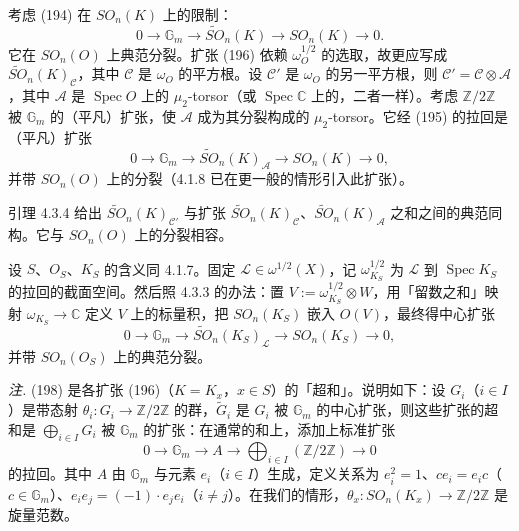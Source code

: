  考虑 (194) 在 $SO_{n}(K)$ 上的限制：
\begin{equation}\tag{196}
0\to\mathbb{G}_{m}\to\tilde{SO}_{n}(K)\to SO_{n}(K)\to 0.
\end{equation}
它在 $SO_{n}(O)$ 上典范分裂。扩张 (196) 依赖 $\omega_{O}^{1/2}$ 的选取，故更应写成 $\tilde{SO}_{n}(K)_{\mathcal{C}}$，其中 $\mathcal{C}$ 是 $\omega_{O}$ 的平方根。设 $\mathcal{C}'$ 是 $\omega_{O}$ 的另一平方根，则 $\mathcal{C}'=\mathcal{C}\otimes\mathcal{A}$，其中 $\mathcal{A}$ 是 $\operatorname{Spec} O$ 上的 $\mu_{2}$-torsor（或 $\operatorname{Spec}\mathbb{C}$ 上的，二者一样）。考虑 $\mathbb{Z}/2\mathbb{Z}$ 被 $\mathbb{G}_{m}$ 的（平凡）扩张，使 $\mathcal{A}$ 成为其分裂构成的 $\mu_{2}$-torsor。它经 (195) 的拉回是（平凡）扩张
\begin{equation}\tag{197}
0\to\mathbb{G}_{m}\to\tilde{SO}_{n}(K)_{\mathcal{A}}\to SO_{n}(K)\to 0,
\end{equation}
并带 $SO_{n}(O)$ 上的分裂（4.1.8 已在更一般的情形引入此扩张）。

引理 4.3.4 给出 $\tilde{SO}_{n}(K)_{\mathcal{C}'}$ 与扩张 $\tilde{SO}_{n}(K)_{\mathcal{C}}$、$\tilde{SO}_{n}(K)_{\mathcal{A}}$ 之和之间的典范同构。它与 $SO_{n}(O)$ 上的分裂相容。

 设 $S$、$O_{S}$、$K_{S}$ 的含义同 4.1.7。固定 $\mathcal{L}\in\omega^{1/2}(X)$，记 $\omega_{K_{S}}^{1/2}$ 为 $\mathcal{L}$ 到 $\operatorname{Spec} K_{S}$ 的拉回的截面空间。然后照 4.3.3 的办法：置 $V:=\omega_{K_{S}}^{1/2}\otimes W$，用「留数之和」映射 $\omega_{K_{S}}\to\mathbb{C}$ 定义 $V$ 上的标量积，把 $SO_{n}(K_{S})$ 嵌入 $O(V)$，最终得中心扩张
\begin{equation}\tag{198}
0\to\mathbb{G}_{m}\to\tilde{SO}_{n}(K_{S})_{\mathcal{L}}\to SO_{n}(K_{S})\to 0,
\end{equation}
并带 $SO_{n}(O_{S})$ 上的典范分裂。

\emph{注.} (198) 是各扩张 (196)（$K=K_{x}$，$x\in S$）的「超和」。说明如下：设 $G_{i}$（$i\in I$）是带态射 $\theta_{i}:G_{i}\to\mathbb{Z}/2\mathbb{Z}$ 的群，$\tilde{G}_{i}$ 是 $G_{i}$ 被 $\mathbb{G}_{m}$ 的中心扩张，则这些扩张的超和是 $\bigoplus_{i\in I}G_{i}$ 被 $\mathbb{G}_{m}$ 的扩张：在通常的和上，添加上标准扩张
\[
0\to\mathbb{G}_{m}\to A\to\bigoplus_{i\in I}(\mathbb{Z}/2\mathbb{Z})\to 0
\]
的拉回。其中 $A$ 由 $\mathbb{G}_{m}$ 与元素 $e_{i}$（$i\in I$）生成，定义关系为 $e_{i}^{2}=1$、$ce_{i}=e_{i}c$（$c\in\mathbb{G}_{m}$）、$e_{i}e_{j}=(-1)\cdot e_{j}e_{i}$（$i\neq j$）。在我们的情形，$\theta_{x}:SO_{n}(K_{x})\to\mathbb{Z}/2\mathbb{Z}$ 是旋量范数。

